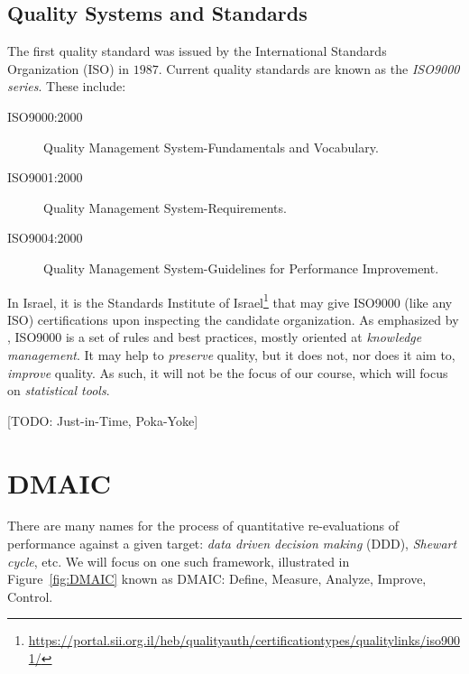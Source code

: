 \subsection{Quality Systems and Standards}
The first quality standard was issued by the International Standards Organization (ISO) in $1987$.
Current quality standards are known as the \emph{ISO9000 series}. These include:
\begin{description}
\item [ISO9000:2000] Quality Management System-Fundamentals and Vocabulary.
\item [ISO9001:2000] Quality Management System-Requirements.
\item [ISO9004:2000] Quality Management System-Guidelines for Performance Improvement.
\end{description}
In Israel, it is the Standards Institute of Israel\footnote{\url{https://portal.sii.org.il/heb/qualityauth/certificationtypes/qualitylinks/iso9001/}} that may give ISO9000 (like any ISO) certifications upon inspecting the candidate organization.
As emphasized by \citet[p.24]{montgomery_introduction_2007}, ISO9000 is a set of rules and best practices, mostly oriented at \emph{knowledge management}. 
It may help to \emph{preserve} quality, but it does not, nor does it aim to, \emph{improve} quality.
As such, it will not be the focus of our course, which will focus on \emph{statistical tools}.


\begin{extra}

[TODO: Just-in-Time, Poka-Yoke]

\end{extra}




\section{DMAIC}
There are many names for the process of quantitative re-evaluations of performance against a given target: \emph{data driven decision making} (DDD), \emph{Shewart cycle}, etc.
We will focus on one such framework, illustrated in Figure~\ref{fig:DMAIC} known as DMAIC: Define, Measure, Analyze, Improve, Control.


